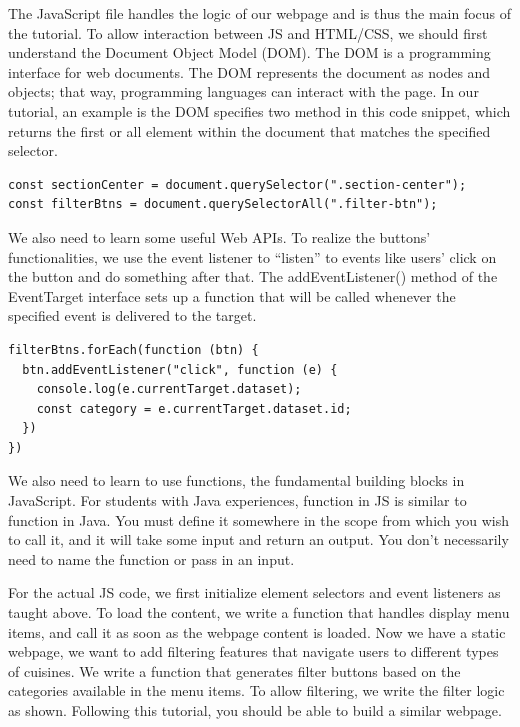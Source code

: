 \documentclass[10pt,twocolumn]{article}
\begin{document}
The JavaScript file handles the logic of our webpage and is thus the main focus of the tutorial. To allow interaction between JS and HTML/CSS, we should first understand the Document Object Model (DOM). The DOM is a programming interface for web documents. The DOM represents the document as nodes and objects; that way, programming languages can interact with the page. In our tutorial, an example is the DOM specifies two method in this code snippet, which returns the first or all element within the document that matches the specified selector.

\begin{lstlisting}[caption= Document method example]
const sectionCenter = document.querySelector(".section-center");
const filterBtns = document.querySelectorAll(".filter-btn");
\end{lstlisting}

We also need to learn some useful Web APIs. To realize the buttons’ functionalities, we use the event listener to “listen” to events like users’ click on the button and do something after that. The addEventListener() method of the EventTarget interface sets up a function that will be called whenever the specified event is delivered to the target.

\begin{lstlisting}[caption= Listeners example]
filterBtns.forEach(function (btn) {
  btn.addEventListener("click", function (e) {
    console.log(e.currentTarget.dataset);
    const category = e.currentTarget.dataset.id;    
  })
})
\end{lstlisting}

We also need to learn to use functions, the fundamental building blocks in JavaScript. For students with Java experiences, function in JS is similar to function in Java. You must define it somewhere in the scope from which you wish to call it, and it will take some input and return an output. You don’t necessarily need to name the function or pass in an input.

For the actual JS code, we first initialize element selectors and event listeners as taught above. To load the content, we write a function that handles display menu items, and call it as soon as the webpage content is loaded. Now we have a static webpage, we want to add filtering features that navigate users to different types of cuisines. We write a function that generates filter buttons based on the categories available in the menu items. To allow filtering, we write the filter logic as shown. Following this tutorial, you should be able to build a similar webpage.
\end{document}
